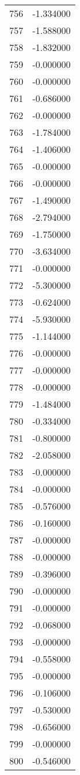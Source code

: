 \documentclass[12pt]{article}
\begin{document}
\begin{longtable}{@{}cc@{}}
756 & -1.334000 \\
757 & -1.588000 \\
758 & -1.832000 \\
759 & -0.000000 \\
760 & -0.000000 \\
761 & -0.686000 \\
762 & -0.000000 \\
763 & -1.784000 \\
764 & -1.406000 \\
765 & -0.000000 \\
766 & -0.000000 \\
767 & -1.490000 \\
768 & -2.794000 \\
769 & -1.750000 \\
770 & -3.634000 \\
771 & -0.000000 \\
772 & -5.300000 \\
773 & -0.624000 \\
774 & -5.930000 \\
775 & -1.144000 \\
776 & -0.000000 \\
777 & -0.000000 \\
778 & -0.000000 \\
779 & -1.484000 \\
780 & -0.334000 \\
781 & -0.800000 \\
782 & -2.058000 \\
783 & -0.000000 \\
784 & -0.000000 \\
785 & -0.576000 \\
786 & -0.160000 \\
787 & -0.000000 \\
788 & -0.000000 \\
789 & -0.396000 \\
790 & -0.000000 \\
791 & -0.000000 \\
792 & -0.068000 \\
793 & -0.000000 \\
794 & -0.558000 \\
795 & -0.000000 \\
796 & -0.106000 \\
797 & -0.530000 \\
798 & -0.656000 \\
799 & -0.000000 \\
800 & -0.546000 \\

\end{longtable}
\end{document}
